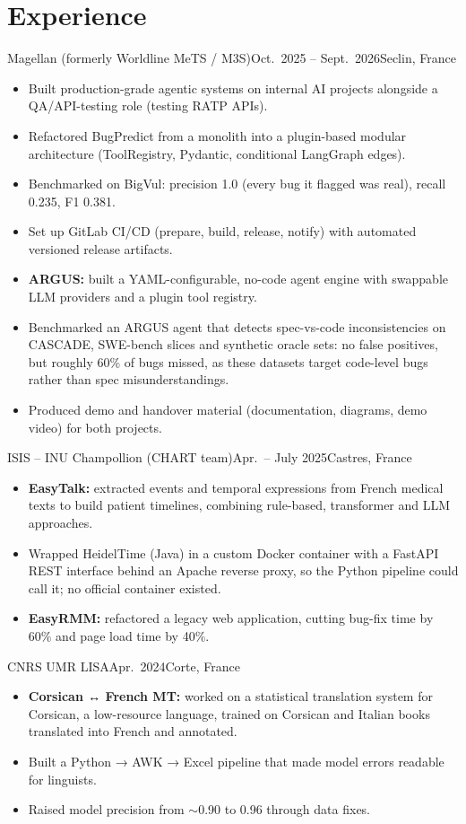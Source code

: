\documentclass[english]{resume}
\begin{document}
\section{Experience}
  {Magellan (formerly Worldline MeTS / M3S)}{Oct.\ 2025 -- Sept.\ 2026}{Seclin, France}
\begin{itemize}
  \item Built production-grade agentic systems on internal AI projects alongside a QA/API-testing role (testing RATP APIs).
  \item Refactored BugPredict from a monolith into a plugin-based modular architecture (ToolRegistry, Pydantic, conditional LangGraph edges).
  \item Benchmarked on BigVul: precision 1.0 (every bug it flagged was real), recall 0.235, F1 0.381.
  \item Set up GitLab CI/CD (prepare, build, release, notify) with automated versioned release artifacts.
  \item \textbf{ARGUS:} built a YAML-configurable, no-code agent engine with swappable LLM providers and a plugin tool registry.
  \item Benchmarked an ARGUS agent that detects spec-vs-code inconsistencies on CASCADE, SWE-bench slices and synthetic oracle sets: no false positives, but roughly 60\% of bugs missed, as these datasets target code-level bugs rather than spec misunderstandings.
  \item Produced demo and handover material (documentation, diagrams, demo video) for both projects.
\end{itemize}
  {ISIS – INU Champollion (CHART team)}{Apr.\ -- July 2025}{Castres, France}
\begin{itemize}
  \item \textbf{EasyTalk:} extracted events and temporal expressions from French medical texts to build patient timelines, combining rule-based, transformer and LLM approaches.
  \item Wrapped HeidelTime (Java) in a custom Docker container with a FastAPI REST interface behind an Apache reverse proxy, so the Python pipeline could call it; no official container existed.
  \item \textbf{EasyRMM:} refactored a legacy web application, cutting bug-fix time by 60\% and page load time by 40\%.
\end{itemize}
  {CNRS UMR LISA}{Apr.\ 2024}{Corte, France}
\begin{itemize}
  \item \textbf{Corsican ↔ French MT:} worked on a statistical translation system for Corsican, a low-resource language, trained on Corsican and Italian books translated into French and annotated.
  \item Built a Python → AWK → Excel pipeline that made model errors readable for linguists.
  \item Raised model precision from $\sim$0.90 to 0.96 through data fixes.
\end{itemize}
\end{document}

